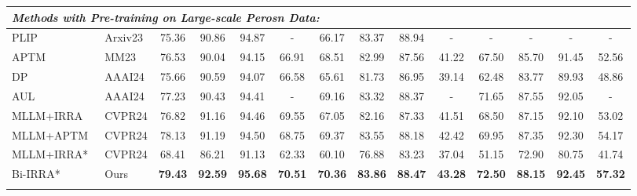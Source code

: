 \begin{table}[t]
{{\begin{tabular}{l|l|cccc|cccc|cccc}
    \multicolumn{14}{l}{\textit{Methods with Pre-training on Large-scale Perosn Data:}} \\
    \hline\hline
    PLIP~\cite{zuo2023plip}    & Arxiv23                    & 75.36 & 90.86 & 94.87  &  -     & 66.17 & 83.37 & 88.94  &   -    &  -    & -     & -     & -      \\
    APTM~\cite{yang2023towards}& MM23                       & 76.53 & 90.04 & 94.15  & 66.91  & 68.51 & 82.99 & 87.56  & 41.22  & 67.50 & 85.70 & 91.45 & 52.56  \\
    DP~\cite{song2024diverse}  & AAAI24                     & 75.66 & 90.59 & 94.07 & 66.58  & 65.61 & 81.73 & 86.95 & 39.14  & 62.48 & 83.77 & 89.93 & 48.86  \\ 
    AUL~\cite{li2024adaptive}  & AAAI24                     & 77.23 & 90.43 & 94.41 &   -    & 69.16 & 83.32 & 88.37  &   -    & 71.65 & 87.55 & 92.05 &   -    \\
    MLLM+IRRA~\cite{tan2024harnessing}& CVPR24         & 76.82 & 91.16 & 94.46 & 69.55 & 67.05 & 82.16 & 87.33 & 41.51 & 68.50 & 87.15 & 92.10 & 53.02  \\
    MLLM+APTM~\cite{tan2024harnessing}& CVPR24         & 78.13 & 91.19 & 94.50 & 68.75 & 69.37 & 83.55 & 88.18 & 42.42  & 69.95 & 87.35 & 92.30 & 54.17  \\
    \hdashline
    MLLM+IRRA*~\cite{tan2024harnessing}& CVPR24        & 68.41 & 86.21 & 91.13 & 62.33 & 60.10 & 76.88 & 83.23 & 37.04
          & 51.15 & 72.90 & 80.75 & 41.74 \\
    \hline\rowcolor[HTML]{D7F6FF}
    Bi-IRRA*      & Ours                       & \textbf{79.43} & \textbf{92.59} & \textbf{95.68} & \textbf{70.51} & \textbf{70.36} & \textbf{83.86} & \textbf{88.47} & \textbf{43.28}  & \textbf{72.50} & \textbf{88.15} & \textbf{92.45} & \textbf{57.32} \\
    \hline\thickhline
    \end{tabular}
    }}
    \label{tab: sota tipr}
\end{table}

